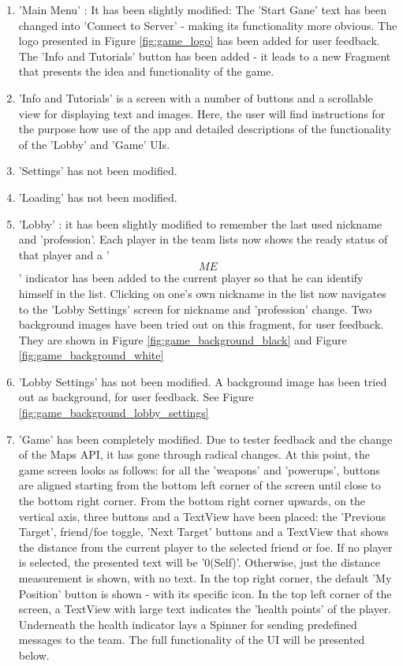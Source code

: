 \begin{enumerate}
  \item 'Main Menu' : It has been slightly modified: The 'Start Gane' text has
  been changed into 'Connect to Server' - making its functionality more
  obvious. The logo presented in Figure \ref{fig:game_logo} has been added for
  user feedback. The 'Info and Tutorials' button has been added - it leads to
  a new Fragment that presents the idea and functionality of the game.
  
  \item 'Info and Tutorials' is a screen with a number of buttons and a
  scrollable view for displaying text and images. Here, the user will find
  instructions for the purpose how use of the app and detailed descriptions of
  the functionality of the 'Lobby' and 'Game' UIs.
  
  \item 'Settings' has not been modified.
  
  \item 'Loading' has not been modified.
  
  \item 'Lobby' : it has been slightly modified to remember the last used
  nickname and 'profession'. Each player in the team lists now shows the ready
  status of that player and a '\[ME\]' indicator has been added to the current
  player so that he can identify himself in the list. Clicking on one's own
  nickname in the list now navigates to the 'Lobby Settings' screen for
  nickname and 'profession' change. Two background images have been tried out on
  this fragment, for user feedback. They are shown in Figure
  \ref{fig:game_background_black} and Figure \ref{fig:game_background_white} 
  
  \item 'Lobby Settings' has not been modified. A background image has been
  tried out as background, for user feedback. See Figure
  \ref{fig:game_background_lobby_settings}
  
  \item 'Game' has been completely modified. Due to tester feedback and
  the change of the Maps API, it has gone through radical changes. At this
  point, the game screen looks as follows: for all the 'weapons' and 'powerups',
  buttons are aligned starting from the bottom left corner of the screen until
  close to the bottom right corner. From the bottom right corner upwards, on
  the vertical axis, three buttons and a TextView have been placed: the
  'Previous Target', friend/foe toggle, 'Next Target' buttons and a TextView
  that shows the distance from the current player to the selected friend or
  foe. If no player is selected, the presented text will be '0(Self)'.
  Otherwise, just the distance measurement is shown, with no text. In the top
  right corner, the default 'My Position' button is shown - with its specific
  icon. In the top left corner of the screen, a TextView with large text
  indicates the 'health points' of the player. Underneath the health indicator
  lays a Spinner for sending predefined messages to the team. The full
  functionality of the UI will be presented below.
  
\end{enumerate}

